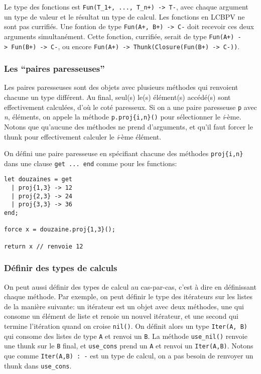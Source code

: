 \documentclass[
]{article}
\begin{document}
Le type des fonctions est
\texttt{Fun(T\_1+,\ ...,\ T\_n+)\ -\textgreater{}\ T-}, avec chaque
argument un type de valeur et le résultat un type de calcul. Les
fonctions en LCBPV ne sont pas currifiés. Une fontion de type
\texttt{Fun(A+,\ B+)\ -\textgreater{}\ C-} doit recevoir ces deux
arguments simultanément. Cette fonction, currifiée, serait de type
\texttt{Fun(A+)\ -\textgreater{}\ Fun(B+)\ -\textgreater{}\ C-}, ou
encore
\texttt{Fun(A+)\ -\textgreater{}\ Thunk(Closure(Fun(B+)\ -\textgreater{}\ C-))}.

\hypertarget{les-paires-paresseuses}{%
\subsubsection{Les ``paires
paresseuses''}\label{les-paires-paresseuses}}

Les paires paresseuses sont des objets avec plusieurs méthodes qui
renvoient chacune un type différent. Au final, seul(s) le(s) élément(s)
accédé(s) sont effectivement calculées, d'où le coté paresseux. Si on a
une paire paresseuse \texttt{p} avec \emph{n}, éléments, on appele la
méthode \texttt{p.proj\{i,n\}()} pour sélectionner le \emph{i}-ème.
Notons que qu'aucune des méthodes ne prend d'arguments, et qu'il faut
forcer le thunk pour effectivement calculer le \emph{i}-ème élément.

On défini une paire paresseuse en spécifiant chacune des méthodes
\texttt{proj\{i,n\}} dans une clause \texttt{get\ ...\ end} comme pour
les functions:

\begin{verbatim}
let douzaines = get
  | proj{1,3} -> 12
  | proj{2,3} -> 24
  | proj{3,3} -> 36
end;

force x = douzaine.proj{1,3}();

return x // renvoie 12
\end{verbatim}

\hypertarget{duxe9finir-des-types-de-calculs}{%
\subsubsection{Définir des types de
calculs}\label{duxe9finir-des-types-de-calculs}}

On peut aussi définir des types de calcul au cas-par-cas, c'est à dire
en définissant chaque méthode. Par exemple, on peut définir le type des
itérateurs sur les listes de la manière suivante: un itérateur est un
objet avec deux méthodes, une qui consome un élément de liste et renoie
un nouvel itérateur, et une second qui termine l'itération quand on
croise \texttt{nil()}. On définit alors un type \texttt{Iter(A,\ B)} qui
consome des listes de type \texttt{A} et renvoi un \texttt{B}. La
méthode \texttt{use\_nil()} renvoie une thunk sur le \texttt{B} final,
et \texttt{use\_cons} prend un \texttt{A} et renvoi un
\texttt{Iter(A,B)}. Notons que comme \texttt{Iter(A,B)\ :\ -} est un
type de calcul, on a pas besoin de renvoyer un thunk dans
\texttt{use\_cons}.
\end{document}
